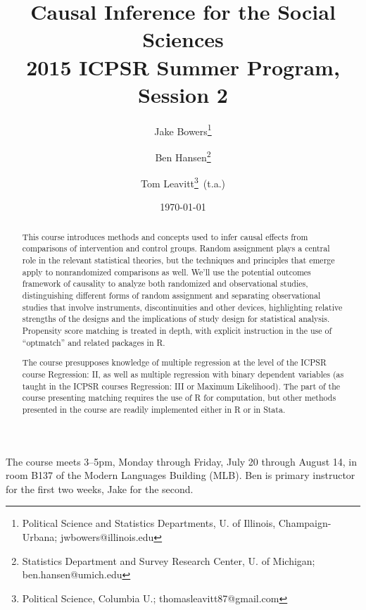 \documentclass[12pt]{article}
\title{Causal Inference for the Social Sciences\\2015 ICPSR Summer
  Program, Session 2 
}
\author{ Jake Bowers\thanks{ Political Science and Statistics
    Departments, U. of Illinois, Champaign-Urbana; jwbowers@illinois.edu}
\and Ben Hansen\thanks{Statistics Department and Survey Research
  Center, U. of Michigan; ben.hansen@umich.edu} \and Tom
Leavitt\thanks{Political Science, Columbia U.; \mbox{thomasleavitt87@gmail.com}}\,  (t.a.)}
\date{\today}
\begin{document}
\maketitle
\begin{abstract}
This course introduces methods and concepts used to infer causal
effects from comparisons of intervention and control groups.  Random
assignment plays a central role in the relevant statistical theories,
but the techniques and principles that emerge apply to nonrandomized
comparisons as well. We'll use the potential outcomes framework of
causality to analyze both randomized and observational studies,
distinguishing different forms of random assignment and separating
observational studies that involve instruments, discontinuities and
other devices, highlighting relative strengths of the designs and the
implications of study design for statistical analysis. Propensity
score matching is treated in depth, with explicit instruction in the
use of ``optmatch'' and related packages in R.  %

The course presupposes knowledge of multiple regression at the level
of the ICPSR course Regression: II, as well as multiple regression
with binary dependent variables (as taught in the ICPSR courses
Regression: III or Maximum Likelihood).  The part of the course presenting
matching requires the use of R for computation, but other methods presented in
the course are readily implemented either in R or in Stata.
\end{abstract}


The course meets 3--5pm, Monday through Friday, July 20 through August
14,  in room B137 of the Modern Languages
  Building (MLB).
Ben is primary instructor for the first
two weeks, Jake for the second.  
\end{document}
